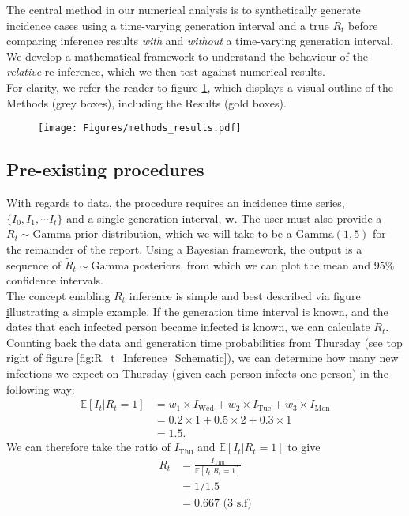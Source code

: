 \documentclass[10pt,journal,compsoc]{IEEEtran}
\begin{document}
The central method in our numerical analysis is to synthetically generate incidence cases using a time-varying generation interval and a true $R_t$ before comparing inference results \textit{with} and \textit{without} a time-varying generation interval. We develop a mathematical framework to understand the behaviour of the \textit{relative} re-inference, which we then test against numerical results. \\

For clarity, we refer the reader to figure \ref{fig:Methods_and_Results}, which displays a visual outline of the Methods (grey boxes), including the Results (gold boxes).

\begin{figure}[h]
\centering
\texttt{[image: Figures/methods\_results.pdf]}
\label{fig:Methods_and_Results}
\end{figure} 

\subsection{Pre-existing procedures}\label{sect:Cori_Method}
With regards to data, the procedure requires an incidence time series, $\{ I_0, I_1, \cdots I_t \}$ and a single generation interval, $\boldsymbol{w}$. The user must also provide a $\tilde{R}_t \sim \mathrm{Gamma}$ prior distribution, which we will take to be a $\mathrm{Gamma}(1, 5)$ for the remainder of the report. Using a Bayesian framework, the output is a sequence of $\tilde{R}_t \sim \mathrm{Gamma}$ posteriors, from which we can plot the mean and $95 \%$ confidence intervals.\\

The concept enabling $R_t$ inference is simple and best described via figure \href{fig:R_t_Inference_Schematic} illustrating a simple example. If the generation time interval is known, and the dates that each infected person became infected is known, we can calculate $R_t$. Counting back the data and generation time probabilities from Thursday (see top right of figure \ref{fig:R_t_Inference_Schematic}), we can determine how many new infections we expect on Thursday (given each person infects one person) in the following way:
\begin{align*}
\mathbb{E}[I_t|R_t=1] &= w_1 \times I_{\text{Wed}} + w_2 \times I_{\text{Tue}} + w_3 \times I_{\text{Mon}}\\
&= 0.2 \times 1 + 0.5 \times 2 + 0.3 \times 1\\
&= 1.5.
\end{align*}
We can therefore take the ratio of $I_{\text{Thu}}$ and $\mathbb{E}[I_t|R_t=1]$ to give
\begin{align*}
R_t &= \frac{I_{\text{Thu}}}{\mathbb{E}[I_t|R_t=1]}\\
&= 1/1.5\\
&= 0.667 \text{ (3 s.f)}
\end{align*}
\end{document}
